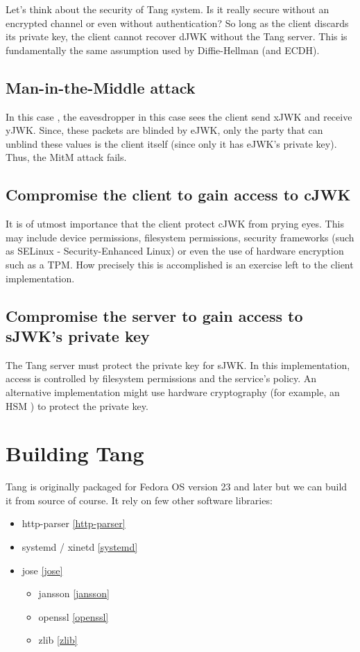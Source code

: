 \documentclass[../xdudla00-porting-Tang-to-Open-WRT.tex]{subfiles}
\begin{document}
Let's think about the security of Tang system. Is it really secure without an encrypted channel or even without authentication?
So long as the client discards its private key, the client cannot recover dJWK without the Tang server.
This is fundamentally the same assumption used by Diffie-Hellman (and ECDH)\cite{ecdh}.

\subsection{Man-in-the-Middle attack}
In this case \cite{mitm}, the eavesdropper in this case sees the client send xJWK and receive yJWK.
Since, these packets are blinded by eJWK, only the party that can unblind these values is the client itself (since only it has eJWK's private key).
Thus, the MitM attack fails.
\subsection{Compromise the client to gain access to cJWK}
It is of utmost importance that the client protect cJWK from prying eyes.
This may include device permissions, filesystem permissions, security frameworks (such as SELinux \cite{selinux}- Security-Enhanced Linux) or even the use of hardware encryption such as a TPM.
How precisely this is accomplished is an exercise left to the client implementation.
\subsection{Compromise the server to gain access to sJWK's private key}
The Tang server must protect the private key for sJWK.
In this implementation, access is controlled by filesystem permissions and the service's policy.
An alternative implementation might use hardware cryptography (for example, an HSM \cite{hsm}) to protect the private key.
\section{Building Tang}

Tang is originally packaged for Fedora OS\cite{fedora} version 23 and later but we can build it from source of course.
It rely on few other software libraries:

\begin{itemize}
\item http-parser \ref{http-parser}
\item systemd / xinetd \ref{systemd}
\item jose \ref{jose}
    \begin{itemize}
    \item jansson \ref{jansson}
    \item openssl \ref{openssl}
    \item zlib \ref{zlib}
    \end{itemize}
\end{itemize}
\end{document}
